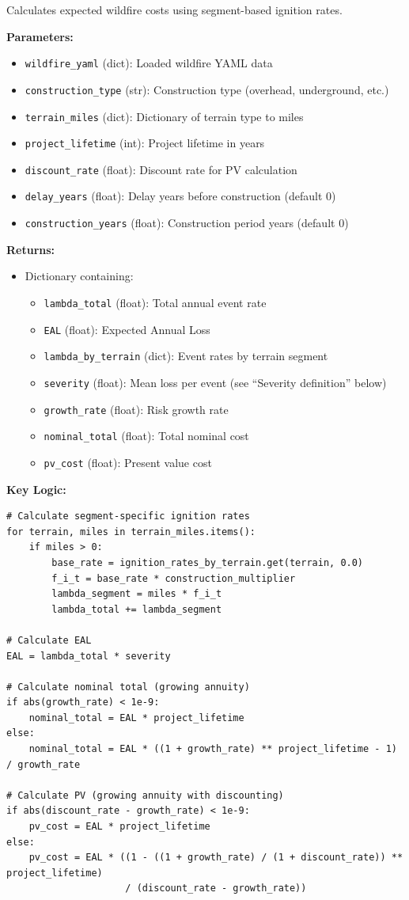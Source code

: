 \documentclass[ctcc_full_documentation.tex]{subfiles}
\begin{document}
Calculates expected wildfire costs using segment-based ignition rates.

\textbf{Parameters:}
\begin{itemize}
    \item \texttt{wildfire\_yaml} (dict): Loaded wildfire YAML data
    \item \texttt{construction\_type} (str): Construction type (overhead, underground, etc.)
    \item \texttt{terrain\_miles} (dict): Dictionary of terrain type to miles
    \item \texttt{project\_lifetime} (int): Project lifetime in years
    \item \texttt{discount\_rate} (float): Discount rate for PV calculation
    \item \texttt{delay\_years} (float): Delay years before construction (default 0)
    \item \texttt{construction\_years} (float): Construction period years (default 0)
\end{itemize}

\textbf{Returns:}
\begin{itemize}
    \item Dictionary containing:
    \begin{itemize}
        \item \texttt{lambda\_total} (float): Total annual event rate
        \item \texttt{EAL} (float): Expected Annual Loss
        \item \texttt{lambda\_by\_terrain} (dict): Event rates by terrain segment
        \item \texttt{severity} (float): Mean loss per event (see ``Severity definition'' below)
        \item \texttt{growth\_rate} (float): Risk growth rate
        \item \texttt{nominal\_total} (float): Total nominal cost
        \item \texttt{pv\_cost} (float): Present value cost
    \end{itemize}
\end{itemize}

\textbf{Key Logic:}
\begin{lstlisting}
# Calculate segment-specific ignition rates
for terrain, miles in terrain_miles.items():
    if miles > 0:
        base_rate = ignition_rates_by_terrain.get(terrain, 0.0)
        f_i_t = base_rate * construction_multiplier
        lambda_segment = miles * f_i_t
        lambda_total += lambda_segment

# Calculate EAL
EAL = lambda_total * severity

# Calculate nominal total (growing annuity)
if abs(growth_rate) < 1e-9:
    nominal_total = EAL * project_lifetime
else:
    nominal_total = EAL * ((1 + growth_rate) ** project_lifetime - 1) / growth_rate

# Calculate PV (growing annuity with discounting)
if abs(discount_rate - growth_rate) < 1e-9:
    pv_cost = EAL * project_lifetime
else:
    pv_cost = EAL * ((1 - ((1 + growth_rate) / (1 + discount_rate)) ** project_lifetime) 
                     / (discount_rate - growth_rate))
\end{lstlisting}
\end{document}
